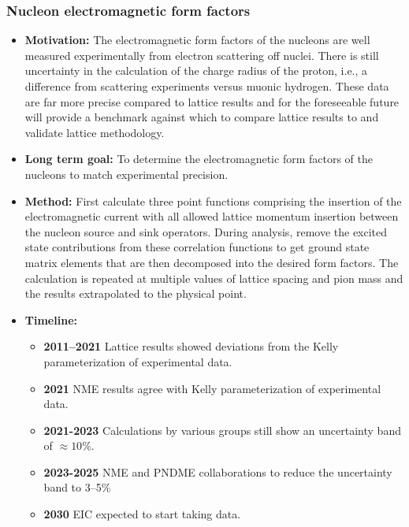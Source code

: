 \documentclass[12pt,hyperpdf]{article}
\begin{document}
\subsubsection{Nucleon electromagnetic form factors}
\begin{itemize}
    \item{\bf Motivation:} The electromagnetic form factors of the nucleons are well measured experimentally from electron 
      scattering off nuclei.  There is still uncertainty in the calculation of the charge radius of the proton, i.e., 
      a difference from scattering experiments versus muonic hydrogen.  These data are far more precise compared to 
      lattice results and for the foreseeable future will provide a benchmark against which to compare lattice results to 
      and validate lattice methodology. 
    \item{\bf Long term goal:} To determine the electromagnetic form factors of the nucleons to match experimental precision. 
    \item{\bf Method:} First calculate three point functions comprising the insertion of the electromagnetic current
      with all allowed lattice momentum insertion between the nucleon source and sink operators. During analysis, remove 
      the excited state contributions from these correlation functions to get ground state matrix elements that are 
      then decomposed into the desired form factors. The calculation is repeated at multiple values of lattice spacing and 
      pion mass and the results extrapolated to the physical point. 
\item{\bf Timeline:}
\begin{itemize}
    \item{\bf 2011--2021} Lattice results showed deviations from the Kelly parameterization of experimental data. 
    \item{\bf 2021} NME results agree with Kelly parameterization of experimental data.
    \item{\bf 2021-2023} Calculations by various groups still show an uncertainty band of $\approx 10\%$.
    \item{\bf 2023-2025} NME and PNDME collaborations to reduce the uncertainty band to 3--5\%
    \item{\bf 2030} EIC expected to start taking data.
\end{itemize}
\end{itemize}

\end{document}
